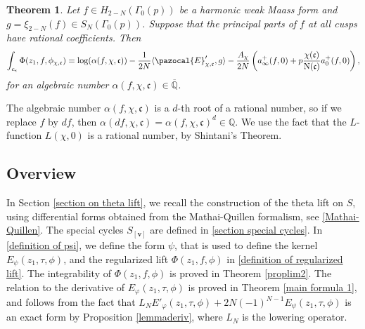 \documentclass[twoside,a4paper,10pt]{article} %
\newcommand{\8}{\infty}
\newcommand{\vbf}{\mathbf{v}}
\newcommand{\Qbar}{\overline{\Q}}
\newcommand{\Q}{\mathbb{Q}}
\newcommand{\dfrak}{\mathfrak{d}}
\newcommand{\cfrak}{\mathfrak{c}}
\newcommand{\N}{\mathrm{N}}
\newcommand{\Ecal}{\pazocal{E}}
\theoremstyle{mytheoremstyle}
\newtheorem{thm}{Theorem}[section]
\theoremstyle{remark}
\numberwithin{equation}{section}
\begin{document}
\begin{thm} \label{main thm intro} Let $f \in H_{2-N}(\Gamma_0(p))$ be a harmonic weak Maass form and $g=\xi_{2-N}(f) \in S_N(\Gamma_0(p))$. Suppose that the principal parts of $f$ at all cusps have rational coefficients. Then
\begin{align}
\int_{c_\epsilon}\Phi(z_1,f,\phi_{\chi,\cfrak}) = \log(\alpha(f,\chi,\cfrak))-\frac{1}{2N} \langle \Ecal'_{\chi,\cfrak},g \rangle -\frac{A_{\chi}}{2N} \left (a^+_\8(f,0)+p \frac{\chi(\cfrak)}{\N(\cfrak)} a^+_0(f,0) \right ),
\end{align}
for an algebraic number $\alpha(f,\chi,\cfrak) \in \Qbar$.
\end{thm}
\noindent The algebraic number $\alpha(f,\chi,\cfrak)$ is a $d$-th root of a rational number, so if we replace $f$ by $df$, then $\alpha(df,\chi,\cfrak)=\alpha(f,\chi,\cfrak)^d \in \Q$. We use the fact that the $L$-function $L(\chi,0)$ is a rational number, by Shintani's Theorem.




%



\subsection{Overview} In Section \ref{section on theta lift}, we recall the construction of the theta lift on $S$, using differential forms obtained from the Mathai-Quillen formalism, see \ref{Mathai-Quillen}. The special cycles $S_{[\vbf]}$ are defined in \ref{section special cycles}. In  \ref{definition of psi}, we define the form $\psi$, that is used to define the kernel $E_\psi(z_1,\tau,\phi)$, and the regularized lift $\Phi(z_1,f,\phi)$ in \ref{definition of regularized lift}. The integrability of $\Phi(z_1,f,\phi)$ is proved in Theorem \ref{proplim2}. The relation to the derivative of $E_{\varphi}(z_1,\tau,\phi)$ is proved in Theorem \ref{main formula 1}, and follows from the fact that $L_N E'_{\varphi}(z_1,\tau,\phi)+2N(-1)^{N-1}E_{\psi}(z_1,\tau,\phi)$ is an exact form by Proposition \ref{lemmaderiv}, where $L_N$ is the lowering operator.
\end{document}
